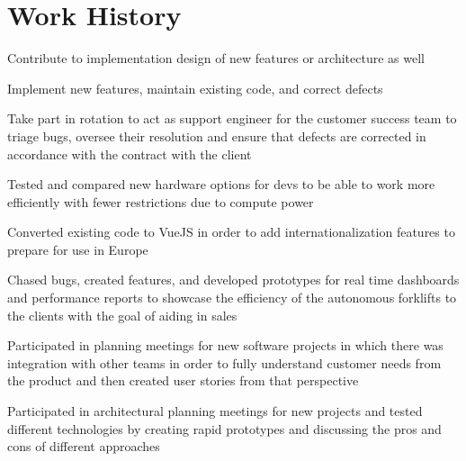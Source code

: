 \documentclass[letterpaper]{resume}
\begin{document}
\section{Work History}

\begin{compactitem}
\item Contribute to implementation design of new features or architecture as well
\item Implement new features, maintain existing code, and correct defects
\item Take part in rotation to act as support engineer for the customer success team to triage bugs, oversee their resolution and ensure that defects are corrected in accordance with the contract with the client
\item Tested and compared new hardware options for devs to be able to work more efficiently with fewer restrictions due to compute power
\end{compactitem}

\begin{compactitem}
\item Converted existing code to VueJS in order to add internationalization features to prepare for use in Europe
\item Chased bugs, created features, and developed prototypes for real time dashboards and performance reports to showcase the efficiency of the autonomous forklifts to the clients with the goal of aiding in sales
\item Participated in planning meetings for new software projects in which there was integration with other teams in order to fully understand customer needs from the product and then created user stories from that perspective
\item Participated in architectural planning meetings for new projects and tested different technologies by creating rapid prototypes and discussing the pros and cons of different approaches
\end{compactitem}
\end{document}
